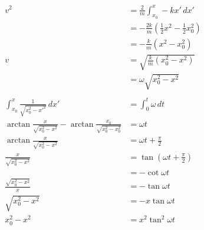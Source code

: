 \documentclass{article}
\begin{document}
\begin{align*}
  v^2                                                                             & = \frac{2}{m} \int_{x_0}^x -k x' \,d x'                             \\
                                                                                  & = -\frac{2 k}{m} \left( \frac{1}{2} x^2 - \frac{1}{2} x_0^2 \right) \\
                                                                                  & = -\frac{k}{m} (x^2 - x_0^2)                                        \\
  v                                                                               & = \sqrt{\frac{k}{m} (x_0^2 - x^2)}                                  \\
                                                                                  & = \omega \sqrt{x_0^2 - x^2}                                         \\ \\
  \int_{x_0}^x \frac{1}{\sqrt{x_0^2 - x'^2}} \,d x'                               & = \int_0^t \omega \,d t                                             \\
  \arctan \frac{x}{\sqrt{x_0^2 - x^2}} - \arctan \frac{x_0}{\sqrt{x_0^2 - x_0^2}} & = \omega t                                                          \\
  \arctan \frac{x}{\sqrt{x_0^2 - x^2}}                                            & = \omega t + \frac{\pi}{2}                                          \\
  \frac{x}{\sqrt{x_0^2 - x^2}}                                                    & = \tan \left( \omega t + \frac{\pi}{2} \right)                      \\
                                                                                  & = -\cot \omega t                                                    \\
  \frac{\sqrt{x_0^2 - x^2}}{x}                                                    & = -\tan \omega t                                                    \\
  \sqrt{x_0^2 - x^2}                                                              & = -x \tan \omega t                                                  \\
  x_0^2 - x^2                                                                     & = x^2 \tan^2 \omega t                                               \\

\end{align*}
\end{document}

